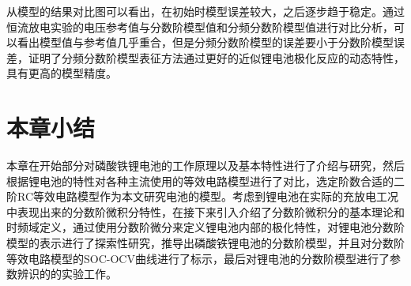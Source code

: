 从模型的结果对比图可以看出，在初始时模型误差较大，之后逐步趋于稳定。通过恒流放电实验的电压参考值与分数阶模型值和分频分数阶模型值进行对比分析，可以看出模型值与参考值几乎重合，但是分频分数阶模型的误差要小于分数阶模型误差，证明了分频分数阶模型表征方法通过更好的近似锂电池极化反应的动态特性，具有更高的模型精度。

\FloatBarrier
\section{本章小结}
本章在开始部分对磷酸铁锂电池的工作原理以及基本特性进行了介绍与研究，然后根据锂电池的特性对各种主流使用的等效电路模型进行了对比，选定阶数合适的二阶RC等效电路模型作为本文研究电池的模型。考虑到锂电池在实际的充放电工况中表现出来的分数阶微积分特性，在接下来引入介绍了分数阶微积分的基本理论和时频域定义，通过使用分数阶微分来定义锂电池内部的极化特性，对锂电池分数阶模型的表示进行了探索性研究，推导出磷酸铁锂电池的分数阶模型，并且对分数阶等效电路模型的SOC-OCV曲线进行了标示，最后对锂电池的分数阶模型进行了参数辨识的的实验工作。

